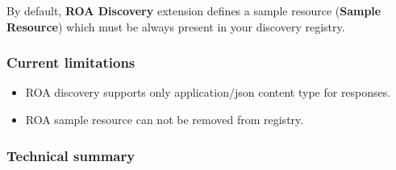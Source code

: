\documentclass[letterpaper,10pt,english]{sphinxmanual}
\begin{document}
By default, \textbf{ROA Discovery} extension defines a sample resource (\textbf{Sample Resource}) which must be always present in your
discovery registry.


\subsubsection{Current limitations}
\label{features/components/roa_discovery/roa_discovery:current-limitations}\begin{itemize}
\item {} 
ROA discovery supports only application/json content type for responses.

\item {} 
ROA sample resource can not be removed from registry.

\end{itemize}


\subsubsection{Technical summary}
\label{features/components/roa_discovery/roa_discovery:technical-summary}
\end{document}
